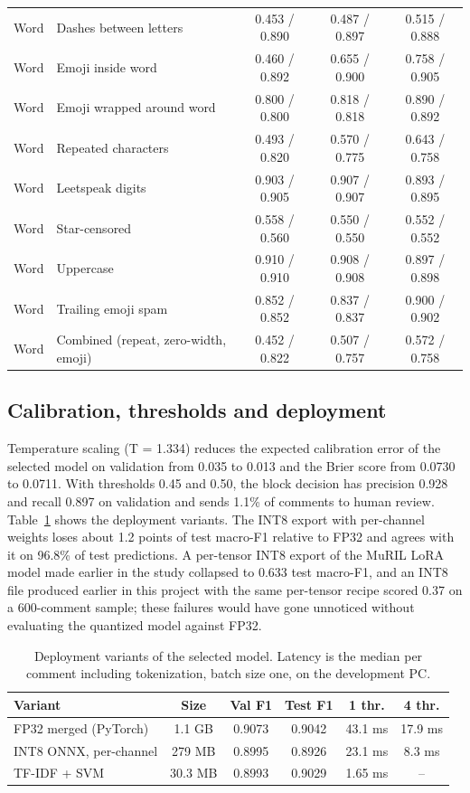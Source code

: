 \documentclass[conference]{IEEEtran}
\begin{document}
\begin{table}[t]
\begin{tabular}{llccc}
Word & Dashes between letters & 0.453 / 0.890 & 0.487 / 0.897 & 0.515 / 0.888 \\
Word & Emoji inside word & 0.460 / 0.892 & 0.655 / 0.900 & 0.758 / 0.905 \\
Word & Emoji wrapped around word & 0.800 / 0.800 & 0.818 / 0.818 & 0.890 / 0.892 \\
Word & Repeated characters & 0.493 / 0.820 & 0.570 / 0.775 & 0.643 / 0.758 \\
Word & Leetspeak digits & 0.903 / 0.905 & 0.907 / 0.907 & 0.893 / 0.895 \\
Word & Star-censored & 0.558 / 0.560 & 0.550 / 0.550 & 0.552 / 0.552 \\
Word & Uppercase & 0.910 / 0.910 & 0.908 / 0.908 & 0.897 / 0.898 \\
Word & Trailing emoji spam & 0.852 / 0.852 & 0.837 / 0.837 & 0.900 / 0.902 \\
Word & Combined (repeat, zero-width, emoji) & 0.452 / 0.822 & 0.507 / 0.757 & 0.572 / 0.758 \\
\bottomrule
\end{tabular}
\end{table}

\subsection{Calibration, thresholds and deployment}
Temperature scaling (T = 1.334) reduces the expected calibration error of the selected model on validation from 0.035 to 0.013 and the Brier score from 0.0730 to 0.0711. With thresholds 0.45 and 0.50, the block decision has precision 0.928 and recall 0.897 on validation and sends 1.1\% of comments to human review. Table~\ref{tab:dep} shows the deployment variants. The INT8 export with per-channel weights loses about 1.2 points of test macro-F1 relative to FP32 and agrees with it on 96.8\% of test predictions. A per-tensor INT8 export of the MuRIL LoRA model made earlier in the study collapsed to 0.633 test macro-F1, and an INT8 file produced earlier in this project with the same per-tensor recipe scored 0.37 on a 600-comment sample; these failures would have gone unnoticed without evaluating the quantized model against FP32.

\begin{table}[t]
\caption{Deployment variants of the selected model. Latency is the median per comment including tokenization, batch size one, on the development PC.}
\label{tab:dep}
\centering
\footnotesize
\setlength{\tabcolsep}{3pt}
\begin{tabular}{lccccc}
\toprule
Variant & Size & Val F1 & Test F1 & 1 thr. & 4 thr. \\
\midrule
FP32 merged (PyTorch) & 1.1 GB & 0.9073 & 0.9042 & 43.1 ms & 17.9 ms \\
INT8 ONNX, per-channel & 279 MB & 0.8995 & 0.8926 & 23.1 ms & 8.3 ms \\
TF-IDF + SVM & 30.3 MB & 0.8993 & 0.9029 & 1.65 ms & -- \\
\bottomrule
\end{tabular}
\end{table}
\end{document}
